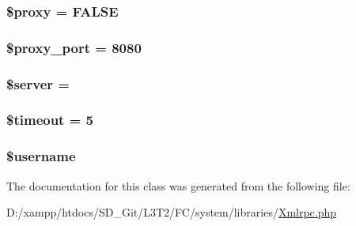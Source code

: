 \subsubsection[{\$proxy}]{\setlength{\rightskip}{0pt plus 5cm}\$proxy = F\+A\+L\+S\+E}\label{class_x_m_l___r_p_c___client_a01564a63e754b8037a987f7f8fde0e6d}
\hypertarget{class_x_m_l___r_p_c___client_a778054bf2337c6516bdad84294329511}{}
\subsubsection[{\$proxy\+\_\+port}]{\setlength{\rightskip}{0pt plus 5cm}\$proxy\+\_\+port = 8080}\label{class_x_m_l___r_p_c___client_a778054bf2337c6516bdad84294329511}
\hypertarget{class_x_m_l___r_p_c___client_ad135cc8a47e55f0829949cf62214170f}{}
\subsubsection[{\$server}]{\setlength{\rightskip}{0pt plus 5cm}\${\bf server} = \textquotesingle{}\textquotesingle{}}\label{class_x_m_l___r_p_c___client_ad135cc8a47e55f0829949cf62214170f}
\hypertarget{class_x_m_l___r_p_c___client_a84320a9bf3e591d7ae20dfcb0dfe6a0d}{}
\subsubsection[{\$timeout}]{\setlength{\rightskip}{0pt plus 5cm}\${\bf timeout} = 5}\label{class_x_m_l___r_p_c___client_a84320a9bf3e591d7ae20dfcb0dfe6a0d}
\hypertarget{class_x_m_l___r_p_c___client_a0eb82aa5f81cf845de4b36cd653c42cf}{}
\subsubsection[{\$username}]{\setlength{\rightskip}{0pt plus 5cm}\$username}\label{class_x_m_l___r_p_c___client_a0eb82aa5f81cf845de4b36cd653c42cf}


The documentation for this class was generated from the following file\+:\begin{DoxyCompactItemize}
\item 
D\+:/xampp/htdocs/\+S\+D\+\_\+\+Git/\+L3\+T2/\+F\+C/system/libraries/\hyperlink{_xmlrpc_8php}{Xmlrpc.\+php}\end{DoxyCompactItemize}

